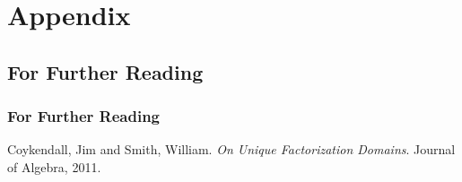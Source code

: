 \appendix

\section*{Appendix}

\subsection*{For Further Reading}

\begin{frame}
  \frametitle[allowframebreaks]{For Further Reading}

  \beamertemplatebookbibitems
  \begin{thebibliography}{2}
    Coykendall, Jim and Smith, William. \newblock\emph{On Unique Factorization Domains}.\newblock
      Journal of Algebra, 2011.\beamertemplatearticlebibitems
  \end{thebibliography}
\end{frame}
